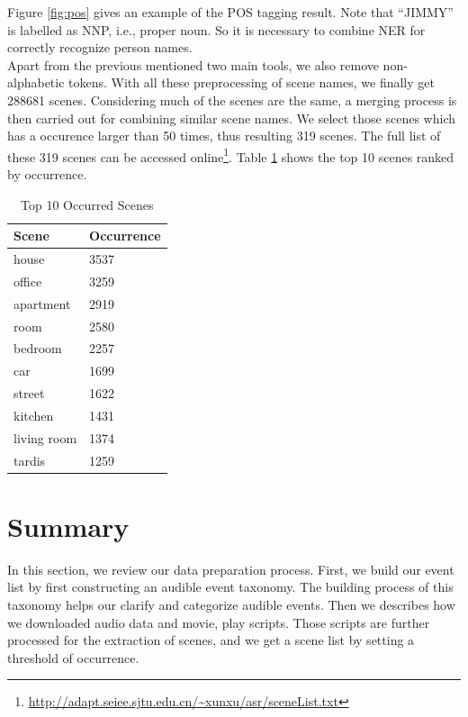 Figure \ref{fig:pos} gives an example of the POS tagging result. 
Note that ``JIMMY'' is labelled as NNP, i.e., proper noun. 
So it is necessary to combine NER for correctly recognize person names. \\ 

Apart from the previous mentioned two main tools, we also remove non-alphabetic tokens. 
With all these preprocessing of scene names, we finally get 288681 scenes. 
Considering much of the scenes are the same, a merging process is then carried out for combining similar scene names. 
We select those scenes which has a occurence larger than 50 times, thus resulting 319 scenes.
The full list of these 319 scenes can be accessed online\footnote{\url{http://adapt.seiee.sjtu.edu.cn/~xunxu/asr/sceneList.txt}}. 
Table \ref{tab:top10scenes} shows the top 10 scenes ranked by occurrence. 
\begin{table}[htb]
\centering
\caption{Top 10 Occurred Scenes}
\begin{tabular}{ll}
\hline
Scene & Occurrence \\
\hline
house & 3537 \\ 
office & 3259 \\ 
apartment & 2919 \\ 
room & 2580 \\ 
bedroom & 2257 \\ 
car & 1699 \\ 
street & 1622 \\ 
kitchen & 1431 \\ 
living room & 1374 \\ 
tardis & 1259 \\ 
\hline
\end{tabular}
\label{tab:top10scenes}
\end{table}

\section{Summary}
In this section, we review our data preparation process. 
First, we build our event list by first constructing an audible event taxonomy. 
The building process of this taxonomy helps our clarify and categorize audible events. 
Then we describes how we downloaded audio data and movie, play scripts. 
Those scripts are further processed for the extraction of scenes, and we get a scene list by setting a threshold of occurrence. 
